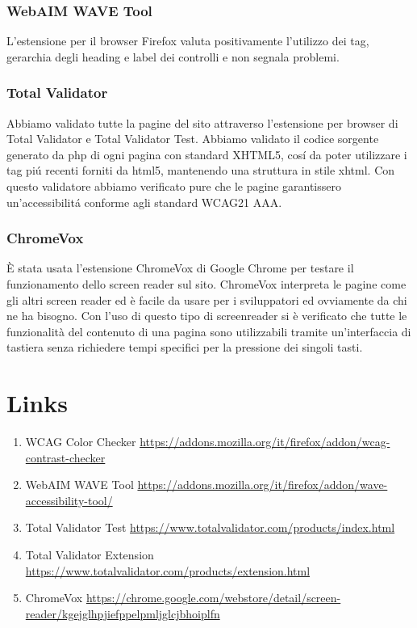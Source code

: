 \subsubsection{WebAIM WAVE Tool}
L'estensione per il browser Firefox valuta positivamente l'utilizzo dei tag, gerarchia degli heading e label dei controlli e non segnala problemi.

\subsubsection{Total Validator}
Abbiamo validato tutte la pagine del sito attraverso l'estensione per browser di Total Validator e Total Validator Test. Abbiamo validato il codice sorgente generato da php di ogni pagina con standard XHTML5, cosí da poter utilizzare i tag piú recenti forniti da html5, mantenendo una struttura in stile xhtml. Con questo validatore abbiamo verificato pure che le pagine garantissero un'accessibilitá conforme agli standard WCAG21 AAA.
\subsubsection{ChromeVox}
È stata usata l'estensione ChromeVox di Google Chrome per testare il funzionamento dello screen reader sul sito. ChromeVox interpreta le pagine come gli altri screen reader ed è facile da usare per i sviluppatori ed ovviamente da chi ne ha bisogno. Con l'uso di questo tipo di screenreader si è verificato che tutte le funzionalità del contenuto di una pagina sono utilizzabili tramite un'interfaccia di tastiera senza richiedere tempi specifici per la pressione dei singoli tasti.


\vfill
\section*{Links}
\begin{enumerate}
	\item WCAG Color Checker \url{https://addons.mozilla.org/it/firefox/addon/wcag-contrast-checker} 
    \item WebAIM WAVE Tool \url{https://addons.mozilla.org/it/firefox/addon/wave-accessibility-tool/} 
    \item Total Validator Test \url{https://www.totalvalidator.com/products/index.html}
    \item Total Validator Extension \url{https://www.totalvalidator.com/products/extension.html}
    \item ChromeVox \url{https://chrome.google.com/webstore/detail/screen-reader/kgejglhpjiefppelpmljglcjbhoiplfn}
\end{enumerate}
    